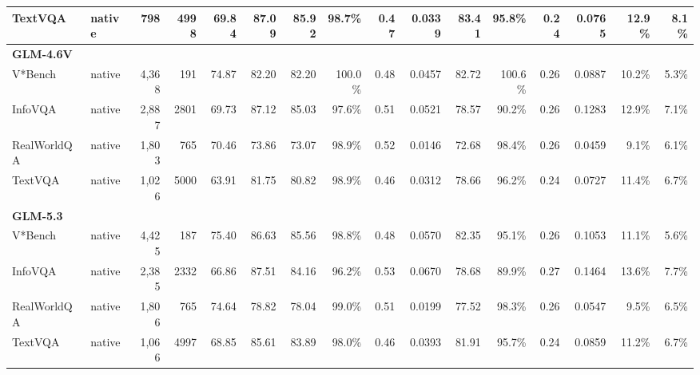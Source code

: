 \begin{table}[t]
\begin{tabular}{llrrrrrrrrrrrrrr}
TextVQA & native & 798 & 4998 & 69.84 & 87.09 & 85.92 & 98.7\% & 0.47 & 0.0339 & 83.41 & 95.8\% & 0.24 & 0.0765 & 12.9\% & 8.1\% \\
\midrule
\multicolumn{10}{l}{\textbf{GLM-4.6V}} \\
V*Bench & native & 4,368 & 191 & 74.87 & 82.20 & 82.20 & 100.0\% & 0.48 & 0.0457 & 82.72 & 100.6\% & 0.26 & 0.0887 & 10.2\% & 5.3\% \\
InfoVQA & native & 2,887 & 2801 & 69.73 & 87.12 & 85.03 & 97.6\% & 0.51 & 0.0521 & 78.57 & 90.2\% & 0.26 & 0.1283 & 12.9\% & 7.1\% \\
RealWorldQA & native & 1,803 & 765 & 70.46 & 73.86 & 73.07 & 98.9\% & 0.52 & 0.0146 & 72.68 & 98.4\% & 0.26 & 0.0459 & 9.1\% & 6.1\% \\
TextVQA & native & 1,026 & 5000 & 63.91 & 81.75 & 80.82 & 98.9\% & 0.46 & 0.0312 & 78.66 & 96.2\% & 0.24 & 0.0727 & 11.4\% & 6.7\% \\
\midrule
\multicolumn{10}{l}{\textbf{GLM-5.3}} \\
V*Bench & native & 4,425 & 187 & 75.40 & 86.63 & 85.56 & 98.8\% & 0.48 & 0.0570 & 82.35 & 95.1\% & 0.26 & 0.1053 & 11.1\% & 5.6\% \\
InfoVQA & native & 2,385 & 2332 & 66.86 & 87.51 & 84.16 & 96.2\% & 0.53 & 0.0670 & 78.68 & 89.9\% & 0.27 & 0.1464 & 13.6\% & 7.7\% \\
RealWorldQA & native & 1,806 & 765 & 74.64 & 78.82 & 78.04 & 99.0\% & 0.51 & 0.0199 & 77.52 & 98.3\% & 0.26 & 0.0547 & 9.5\% & 6.5\% \\
TextVQA & native & 1,066 & 4997 & 68.85 & 85.61 & 83.89 & 98.0\% & 0.46 & 0.0393 & 81.91 & 95.7\% & 0.24 & 0.0859 & 11.2\% & 6.7\% \\
\bottomrule
\end{tabular}
\end{table}
